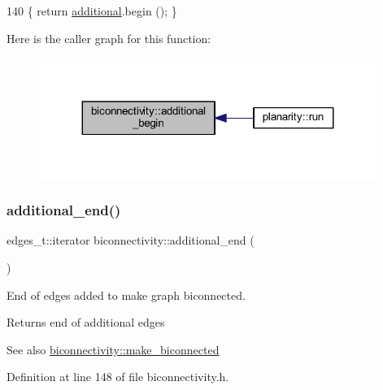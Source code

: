 \begin{DoxyCode}
140     \{ \textcolor{keywordflow}{return} \mbox{\hyperlink{classbiconnectivity_ad5393f67b9526964db540fc63745318f}{additional}}.begin (); \}
\end{DoxyCode}
Here is the caller graph for this function\+:\nopagebreak
\begin{figure}[H]
\begin{center}
\leavevmode
\includegraphics[width=311pt]{classbiconnectivity_a9560cdde8a90c12760b9930c494be410_icgraph}
\end{center}
\end{figure}
\mbox{\label{classbiconnectivity_a801847685ebf2b5727743cd21401e88c}} 
\subsubsection{\texorpdfstring{additional\+\_\+end()}{additional\_end()}}
{\footnotesize\ttfamily edges\+\_\+t\+::iterator biconnectivity\+::additional\+\_\+end (\begin{DoxyParamCaption}{ }\end{DoxyParamCaption})\hspace{0.3cm}{\ttfamily [inline]}}



End of edges added to make graph biconnected. 

\begin{DoxyReturn}{Returns}
end of additional edges 
\end{DoxyReturn}
\begin{DoxySeeAlso}{See also}
\mbox{\hyperlink{classbiconnectivity_a774fd08203a6d164605afc4cdc8b9201}{biconnectivity\+::make\+\_\+biconnected}} 
\end{DoxySeeAlso}


Definition at line 148 of file biconnectivity.\+h.



